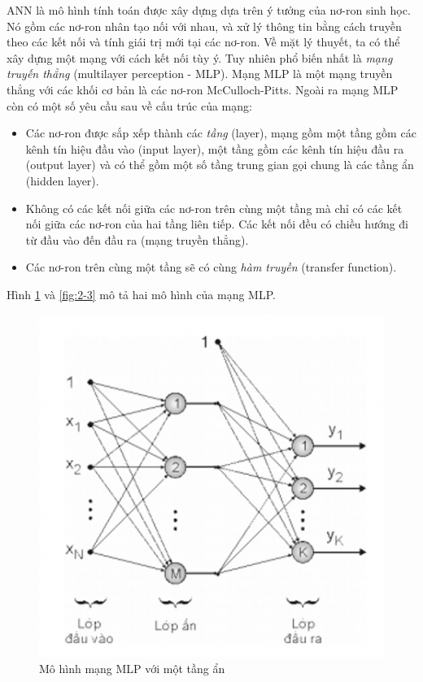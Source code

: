 ANN là mô hình tính toán được xây dựng dựa trên ý tưởng của nơ-ron sinh học. Nó gồm các nơ-ron nhân tạo nối với nhau, và xử lý thông tin bằng cách truyền theo các kết nối và tính giái trị mới tại các nơ-ron. Về mặt lý thuyết, ta có thể xây dựng một mạng với cách kết nối tùy ý. Tuy nhiên phổ biến nhất là \textit{mạng truyến thẳng} (multilayer perception - MLP). Mạng MLP là một mạng truyền thẳng với các khối cơ bản là các nơ-ron McCulloch-Pitts. Ngoài ra mạng MLP còn có một số yêu cầu sau về cấu trúc của mạng:
\begin{itemize}
\item Các nơ-ron được sắp xếp thành các \textit{tầng} (layer), mạng gồm một tầng gồm các kênh tín hiệu đầu vào (input layer), một tầng gồm các kênh tín hiệu đầu ra (output layer) và có thể gồm một số tầng trung gian gọi chung là các tầng ẩn (hidden layer).
\item Không có các kết nối giữa các nơ-ron trên cùng một tầng mà chỉ có các kết nối giữa các nơ-ron của hai tầng liên tiếp. Các kết nối đều có chiều hướng đi từ đầu vào đến đầu ra (mạng truyền thẳng).
\item Các nơ-ron trên cùng một tầng sẽ có cùng \textit{hàm truyền} (transfer function).
\end{itemize}

Hình \ref{fig:2-2} và \ref{fig:2-3} mô tả hai mô hình của mạng MLP.

\begin{figure}[H]
    \centering
    \includegraphics[scale=0.75]{./content/images/2-2.png}
    \caption{Mô hình mạng MLP với một tầng ẩn}
    \label{fig:2-2}
\end{figure}

